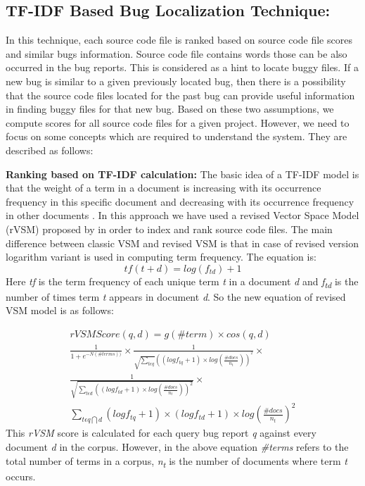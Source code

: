 \documentclass{sig-alternate}
\begin{document}
\subsection{TF-IDF Based Bug Localization Technique:}
In this technique, each source code file is ranked based on source code file scores and similar bugs information. Source code file contains words those can be also occurred in the bug reports. This is considered as a hint to locate buggy files. If a new bug is similar to a given previously located bug, then there is a possibility that the source code files located for the past bug can provide useful information in finding buggy files for that new bug. Based on these two assumptions, we compute scores for all source code files for a given project. However, we need to focus on some concepts which are required to understand the  system. They are described as follows:


\textbf{Ranking based on TF-IDF calculation:}
The basic idea of a TF-IDF model is that the weight of a term in a document is increasing with its occurrence frequency in this specific document and decreasing with its occurrence frequency in other documents \cite{Jian}.
In this approach we have used a revised Vector Space Model (rVSM) proposed by \citet{Jian} in order to index and rank source code files. 
The main difference between classic VSM and revised VSM is that in case of revised version logarithm variant is used in computing term frequency. The equation is:
\begin{equation}
tf(t+d)=log(f_{td})+1
\end{equation}
Here \textit{tf} is the term frequency of each unique term \textit{t} in a document \textit{d} and \textit{f\textsubscript{td}} is the number of times term \textit{t} appears in document \textit{d}.
So the new equation of revised VSM model is as follows:


\begin{multline}
	rVSMScore(q,d)=g(\#term)\times cos(q,d)
	\\
	\frac{1}{1+e^{-N(\#terms))}}\times \frac{1}{\sqrt{\sum_{t\epsilon q}}((logf_{tq}+1)\times log(\frac{\#docs}{n_{t}}))^{^{2}}}\times 
	\\
	\frac{1}{\sqrt{\sum_{t\epsilon d}((log {f_{td}+1})\times log(\frac{\#docs}{n_{t}}))^{2}}}\times
	\\
	\sum_{t\epsilon q\bigcap d}(logf_{tq}+1)\times (logf_{td}+1)\times log(\frac{\#docs}{n_{t}})^{2}
\end{multline}
This \textit{rVSM} score is calculated for each query bug report \textit{q} against every document \textit{d} in the corpus. However, in the above equation \textit{\#terms} refers to the total number of terms in a corpus, \textit{n\textsubscript{t}} is the number of documents where term \textit{t} occurs.
\end{document}
